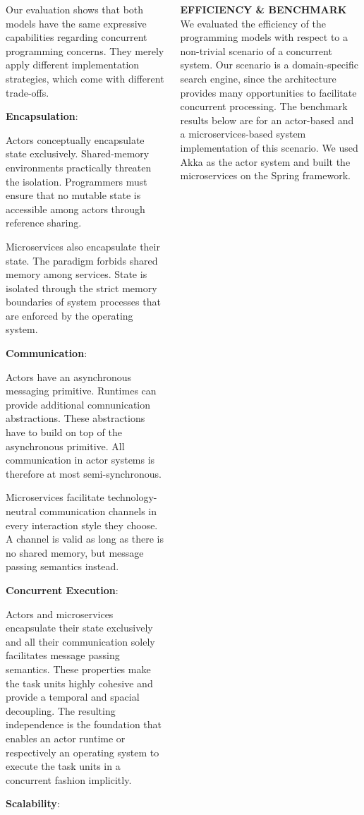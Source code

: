 \documentclass[final,hyperref={pdfpagelabels=true}]{beamer}
\begin{document}
\begin{frame}
\begin{columns}[t]
\begin{column}{.45\textwidth}
{        Our evaluation shows that both models have the same expressive capabilities regarding concurrent programming concerns. They merely apply different implementation strategies, which come with different trade-offs.
        
        \textbf{\textsf{Encapsulation}}:

        Actors conceptually encapsulate state exclusively. Shared-memory environments practically threaten the isolation. Programmers must ensure that no mutable state is accessible among actors through reference sharing.

        Microservices also encapsulate their state. The paradigm forbids shared memory among services. State is isolated through the strict memory boundaries of system processes that are enforced by the operating system.

        \textbf{\textsf{Communication}}:

        Actors have an asynchronous messaging primitive. Runtimes can provide additional comnunication abstractions. These abstractions have to build on top of the asynchronous primitive. All communication in actor systems is therefore at most semi-synchronous.

        Microservices facilitate technology-neutral communication channels in every interaction style they choose. A channel is valid as long as there is no shared memory, but message passing semantics instead.

        \textbf{\textsf{Concurrent Execution}}:

        Actors and microservices encapsulate their state exclusively and all their communication solely facilitates message passing semantics. These properties make the task units highly cohesive and provide a temporal and spacial decoupling. The resulting independence is the foundation that enables an actor runtime or respectively an operating system to execute the task units in a concurrent fashion implicitly.

        \textbf{\textsf{Scalability}}:
        
      }
    \end{column}

    \begin{column}{.45\textwidth}
      \textsf{\textbf{EFFICIENCY \& BENCHMARK}} \\
      \vspace*{\baselineskip}
      {\lmodern
        We evaluated the efficiency of the programming models with respect to a non-trivial scenario of a concurrent system. Our scenario is a domain-specific search engine, since the architecture provides many opportunities to facilitate concurrent processing. The benchmark results below are for an actor-based and a microservices-based system implementation of this scenario. We used Akka as the actor system and built the microservices on the Spring framework.
      }


\end{column}
\end{columns}
\end{frame}
\end{document}
